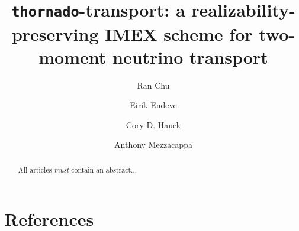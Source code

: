 \documentclass[a4paper]{jpconf}
\begin{document}
\title{\texttt{thornado}-transport: a realizability-preserving IMEX scheme for two-moment neutrino transport}

\author{Ran Chu}
\address{Department of Physics and Astronomy, University of Tennessee Knoxville, TN 37996-1200}

\author{Eirik Endeve}
\address{Department of Physics and Astronomy, University of Tennessee Knoxville, TN 37996-1200}
\address{Computational and Applied Mathematics Group, Oak Ridge National Laboratory, Oak Ridge, TN 37831 USA}

\author{Cory D. Hauck}
\address{Department of Mathematics, University of Tennessee Knoxville, TN 37996-1320}
\address{Computational and Applied Mathematics Group, Oak Ridge National Laboratory, Oak Ridge, TN 37831 USA}

\author{Anthony Mezzacappa}
\address{Department of Physics and Astronomy, University of Tennessee Knoxville, TN 37996-1200}

\begin{abstract}
All articles {\it must} contain an abstract...
\end{abstract}







\section*{References}

\end{document}

